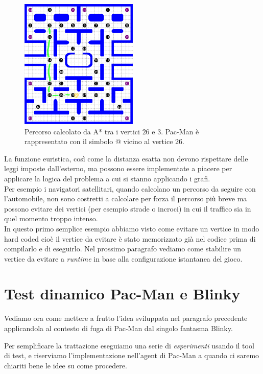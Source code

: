 \documentclass[8pt]{book}
\begin{document}
\begin{figure}
  \centering
  \includegraphics[width=0.5\textwidth]{img/Astar_2.png}
  \caption{Percorso calcolato da A* tra i vertici $26$ e $3$. Pac-Man è rappresentato con il simbolo @ vicino al vertice $26$.}
  \label{Astar_2}
\end{figure}

La funzione euristica, così come la distanza esatta non devono rispettare delle leggi imposte dall'esterno, ma possono essere implementate a piacere per applicare la logica del problema a cui si stanno applicando i grafi.\\
Per esempio i navigatori satellitari, quando calcolano un percorso da seguire con l'automobile, non sono costretti a calcolare per forza il percorso più breve ma possono evitare dei vertici (per esempio strade o incroci) in cui il traffico sia in quel momento troppo intenso.\\
In questo primo semplice esempio abbiamo visto come evitare un vertice in modo hard coded cioè il vertice da evitare è stato memorizzato già nel codice prima di compilarlo e di eseguirlo. Nel prossimo paragrafo vediamo come stabilire un vertice da evitare a \emph{runtime} in base alla configurazione istantanea del gioco.

\section{Test dinamico Pac-Man e Blinky}

Vediamo ora come mettere a frutto l'idea sviluppata nel paragrafo precedente applicandola al contesto di fuga di Pac-Man dal singolo fantasma Blinky.

Per semplificare la trattazione eseguiamo una serie di \emph{esperimenti} usando il tool di test, e riserviamo l'implementazione nell'agent di Pac-Man a quando ci saremo chiariti bene le idee su come procedere.
\end{document}
